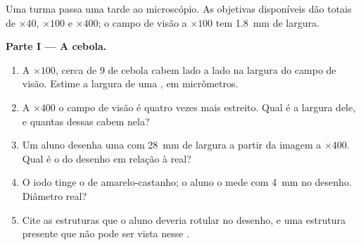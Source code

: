 \begin{problem}
\label{pb:g10:cells-common-unit:1}
Uma turma passa uma tarde ao microscópio. As objetivas disponíveis dão
 totais de $\times 40$, $\times 100$ e $\times 400$; o campo de
visão a $\times 100$ tem \qty{1.8}{mm} de largura.

\medskip
\noindent\textbf{Parte I --- A cebola.}
\begin{enumerate}
  \item A $\times 100$, cerca de 9  de cebola cabem lado a lado
        na largura do campo de visão. Estime a largura de uma ,
        em micrômetros.
  \item A $\times 400$ o campo de visão é quatro vezes mais estreito.
        Qual é a largura dele, e quantas dessas  cabem nela?
  \item Um aluno desenha uma  com \qty{28}{mm} de largura a
        partir da imagem a $\times 400$. Qual é o  do desenho em
        relação à  real?
  \item O iodo tinge o  de amarelo-castanho; o aluno o mede com
        \qty{4}{mm} no desenho. Diâmetro real?
  \item Cite as estruturas que o aluno deveria rotular no desenho, e
        uma estrutura presente que não pode ser vista nesse .
\end{enumerate}


\end{problem}
